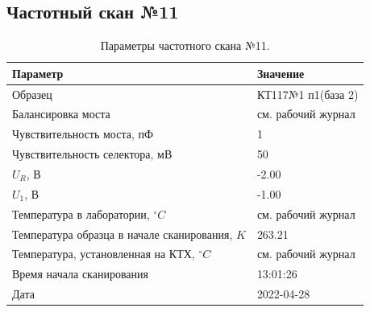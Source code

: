 \subsection{Частотный скан №11}
\begin{table}[!ht]
    \centering
    \caption{Параметры частотного скана №11.}
    \begin{tabular}{|l|l|}
        \hline
        Параметр                                       & Значение                  \\ \hline
        Образец                                        & КТ117№1 п1(база 2)        \\ \hline
        Балансировка моста                             & см. рабочий журнал        \\ \hline
        Чувствительность моста, пФ                     & 1                         \\ \hline
        Чувствительность селектора, мВ                 & 50                        \\ \hline
        $U_R$, В                                       & -2.00                     \\ \hline
        $U_1$, В                                       & -1.00                     \\ \hline
        Температура в лаборатории, $^\circ C$          & см. рабочий журнал        \\ \hline
        Температура образца в начале сканирования, $K$ & 263.21                    \\ \hline
        Температура, установленная на КТХ, $^\circ C$  & см. рабочий журнал        \\ \hline
        Время начала сканирования                      & 13:01:26                  \\ \hline
        Дата                                           & 2022-04-28                \\ \hline
    \end{tabular}
    \label{table:frequency_scan_11}
\end{table}


